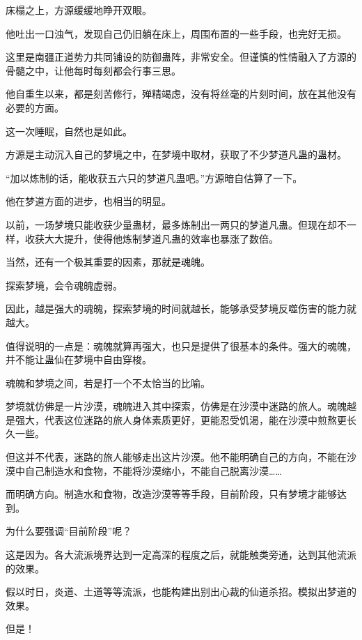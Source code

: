 
\begin{this_body}



床榻之上，方源缓缓地睁开双眼。

他吐出一口浊气，发现自己仍旧躺在床上，周围布置的一些手段，也完好无损。

这里是南疆正道势力共同铺设的防御蛊阵，非常安全。但谨慎的性情融入了方源的骨髓之中，让他每时每刻都会行事三思。

他自重生以来，都是刻苦修行，殚精竭虑，没有将丝毫的片刻时间，放在其他没有必要的方面。

这一次睡眠，自然也是如此。

方源是主动沉入自己的梦境之中，在梦境中取材，获取了不少梦道凡蛊的蛊材。

“加以炼制的话，能收获五六只的梦道凡蛊吧。”方源暗自估算了一下。

他在梦道方面的进步，也相当的明显。

以前，一场梦境只能收获少量蛊材，最多炼制出一两只的梦道凡蛊。但现在却不一样，收获大大提升，使得他炼制梦道凡蛊的效率也暴涨了数倍。

当然，还有一个极其重要的因素，那就是魂魄。

探索梦境，会令魂魄虚弱。

因此，越是强大的魂魄，探索梦境的时间就越长，能够承受梦境反噬伤害的能力就越大。

值得说明的一点是：魂魄就算再强大，也只是提供了很基本的条件。强大的魂魄，并不能让蛊仙在梦境中自由穿梭。

魂魄和梦境之间，若是打一个不太恰当的比喻。

梦境就仿佛是一片沙漠，魂魄进入其中探索，仿佛是在沙漠中迷路的旅人。魂魄越是强大，代表这位迷路的旅人身体素质更好，更能忍受饥渴，能在沙漠中煎熬更长久一些。

但这并不代表，迷路的旅人能够走出这片沙漠。他不能明确自己的方向，不能在沙漠中自己制造水和食物，不能将沙漠缩小，不能自己脱离沙漠……

而明确方向。制造水和食物，改造沙漠等等手段，目前阶段，只有梦境才能够达到。

为什么要强调“目前阶段”呢？

这是因为。各大流派境界达到一定高深的程度之后，就能触类旁通，达到其他流派的效果。

假以时日，炎道、土道等等流派，也能构建出别出心裁的仙道杀招。模拟出梦道的效果。

但是！


\end{this_body}

